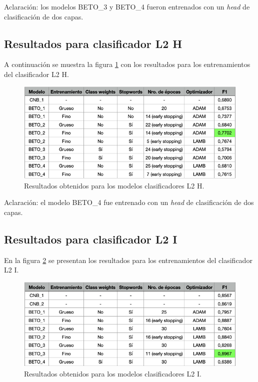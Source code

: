 Aclaración: los modelos BETO\_3 y BETO\_4 fueron entrenados con un \textit{head} de clasificación de dos capas.

\subsection{Resultados para clasificador L2 H}

A continuación se muestra la figura \ref{fig:res-l2h} con los resultados para los entrenamientos del clasificador L2 H.

\begin{figure}[htbp]
	\centering
	\includegraphics[width=1\textwidth]{./Figures/cap4-resultados-l2h.png}
	\caption{Resultados obtenidos para los modelos clasificadores L2 H.}
	\label{fig:res-l2h}
\end{figure}

Aclaración: el modelo BETO\_4 fue entrenado con un \textit{head} de clasificación de dos capas.

\newpage

\subsection{Resultados para clasificador L2 I}

En la figura \ref{fig:res-l2i} se presentan los resultados para los entrenamientos del clasificador L2 I.

\begin{figure}[H]
	\centering
	\includegraphics[width=1\textwidth]{./Figures/cap4-resultados-l2i.png}
	\caption{Resultados obtenidos para los modelos clasificadores L2 I.}
	\label{fig:res-l2i}
\end{figure}

